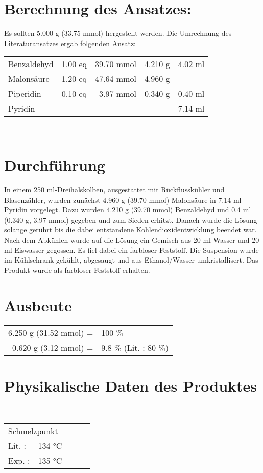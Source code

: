 \documentclass[12pt]{article}
\begin{document}
\begin{onehalfspace}
\section{Berechnung des Ansatzes: } 
Es sollten 5.000 g (33.75 mmol)  hergestellt werden. Die Umrechnung des Literaturansatzes \cite{organikum} ergab folgenden Ansatz:\\[0.5cm]
\begin{tabular}{lrrrr}
Benzaldehyd & 1.00 eq  & 39.70 mmol & 4.210 g & 4.02 ml\\
Malonsäure  & 1.20 eq  & 47.64 mmol & 4.960 g & \\
Piperidin  & 0.10 eq & 3.97 mmol & 0.340 g & 0.40 ml\\
Pyridin  &   & &  & 7.14 ml\\
\end{tabular}\\[0.5cm]
\normalsize \section{Durchführung \cite{organikum}} 
In einem 250 ml-Dreihalskolben, ausgestattet mit Rückflusskühler und Blasenzähler, wurden zunächst 4.960 g (39.70 mmol) Malonsäure in 7.14 ml Pyridin vorgelegt. Dazu wurden 4.210 g (39.70 mmol) Benzaldehyd und 0.4 ml (0.340 g, 3.97 mmol) gegeben und zum Sieden erhitzt. Danach wurde die Lösung solange gerührt bis die dabei entstandene Kohlendioxidentwicklung beendet war. Nach dem Abkühlen wurde auf die Lösung ein Gemisch aus 20 ml Wasser und 20 ml Eiswasser gegossen. Es fiel dabei ein farbloser Feststoff. Die Suspension wurde im Kühlschrank gekühlt, abgesaugt und aus Ethanol/Wasser umkristallisert. Das Produkt wurde als farbloser Feststoff erhalten.
\section{Ausbeute} 
\begin{tabular}{ rl}
  6.250 g (31.52 mmol) =  & 100 \%\\
  0.620 g (3.12 mmol) =  &  9.8 \% (Lit.\cite{organikum} : 80 \%) \\
 \end{tabular}
\section{Physikalische Daten des Produktes} 
\textit{} \\[0.2cm]
\begin{tabular}{ lrclc }
 \multicolumn{2}{l}{Schmelzpunkt} & &   \\
   Lit. \cite{organikum} : &  134 \si{\celsius}  & &  \\
   Exp. :&  135 \si{\celsius} & &  \\
 \end{tabular}


\end{onehalfspace}
\end{document}

